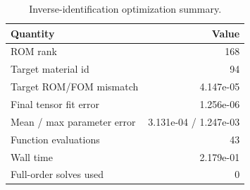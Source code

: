 \begin{table}
\centering
\small
\caption{Inverse-identification optimization summary.}
\label{tab:inverse_summary}
\begin{tabular}{lr}
\toprule
Quantity & Value \\
\midrule
ROM rank & 168 \\
Target material id & 94 \\
Target ROM/FOM mismatch & 4.147e-05 \\
Final tensor fit error & 1.256e-06 \\
Mean / max parameter error & 3.131e-04 / 1.247e-03 \\
Function evaluations & 43 \\
Wall time & 2.179e-01 \\
Full-order solves used & 0 \\
\bottomrule
\end{tabular}
\end{table}
